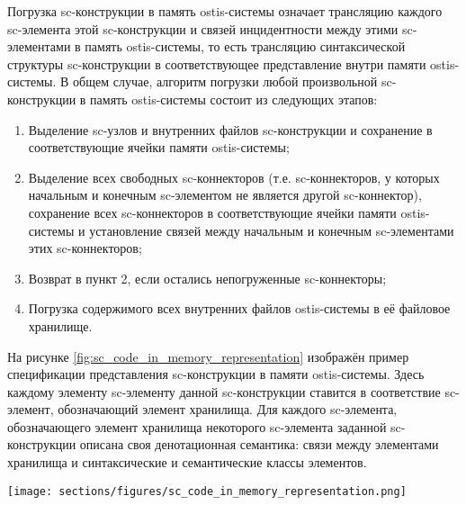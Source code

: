 Погрузка sc-конструкции в память ostis-системы означает трансляцию каждого sc-элемента этой sc-конструкции и связей инцидентности между этими sc-элементами в память ostis-системы, то есть трансляцию синтаксической структуры sc-конструкции в соответствующее представление внутри памяти ostis-системы. В общем случае, алгоритм погрузки любой произвольной sc-конструкции в память ostis-системы состоит из следующих этапов:
\begin{enumerate}
    \item Выделение sc-узлов и внутренних файлов sc-конструкции и сохранение в соответствующие ячейки памяти ostis-системы;
    \item Выделение всех свободных sc-коннекторов (т.е. sc-коннекторов, у которых начальным и конечным sc-элементом не является другой sc-коннектор), сохранение всех sc-коннекторов в соответствующие ячейки памяти ostis-системы и установление связей между начальным и конечным sc-элементами этих sc-коннекторов;
    \item Возврат в пункт 2, если остались непогруженные sc-коннекторы;
    \item Погрузка содержимого всех внутренних файлов ostis-системы в её файловое хранилище.
\end{enumerate}

На рисунке \ref{fig:sc_code_in_memory_representation} изображён пример спецификации представления sc-конструкции в памяти ostis-системы. Здесь каждому элементу sc-элементу данной sc-конструкции ставится в соответствие sc-элемент, обозначающий элемент хранилища. Для каждого sc-элемента, обозначающего элемент хранилища некоторого sc-элемента заданной sc-конструкции описана своя денотационная семантика: связи между элементами хранилища и  синтаксические и семантические классы элементов.

\begin{figure*}[htbp]
  \center
  \texttt{[image: sections/figures/sc\_code\_in\_memory\_representation.png]}
  \caption{Пример спецификации представления конструкции SC-кода в памяти ostis-системы}
  \label{fig:sc_code_in_memory_representation}
\end{figure*}

